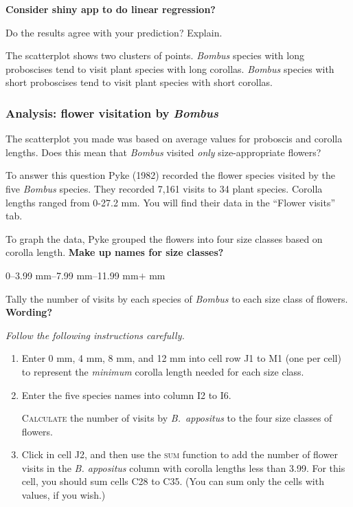 \documentclass[12pt, hidelinks]{exam}
\newcommand*\AnswerBox[2]{%
    \parbox[t][#1]{0.92\textwidth}{%
    \begin{solution}#2\end{solution}}
    \vspace{\stretch{1}}
}
\begin{document}
\begin{questions}
\textbf{Consider shiny app to do linear regression?}

\question
Do the results agree with your prediction? Explain.

\AnswerBox{3\baselineskip}{The scatterplot shows two clusters of points. 
\textit{Bombus} species with long proboscises tend to visit plant species with 
long corollas. \textit{Bombus} species with short proboscises tend to visit plant species with short corollas.}


\subsubsection*{Analysis: flower visitation by \textit{Bombus}}

The scatterplot you made was based on average values for proboscis and corolla 
lengths. Does this mean that \textit{Bombus} visited \emph{only} size-appropriate flowers?  

To answer this question Pyke (1982) recorded the flower species visited by the five \textit{Bombus} species. They recorded 7,161 visits to 34 plant species. Corolla lengths ranged from 0-27.2 mm. You will find their data in the “Flower visits” tab.

To graph the data, Pyke grouped the flowers into four size classes based on corolla length. \textbf{Make up names for size classes?}

0–3.99 mm–7.99 mm–11.99 mm$+$ mm

\question
Tally the number of visits by each species of \textit{Bombus} to each size class of flowers. \textbf{Wording?}

\emph{Follow the following instructions carefully.}

\begin{enumerate}
	\item Enter 0 mm, 4 mm, 8 mm, and 12 mm into cell row J1 to M1 (one per cell)
	to represent the \emph{minimum} corolla length needed for each size class.
	
	\item Enter the five species names into column I2 to I6.
	
	\textsc{Calculate} the number of visits by \textit{B.~appositus} to the four
	size classes of flowers. 
	
	\item Click in cell J2, and then use the \textsc{sum} function to add the
	number of flower visits in the \textit{B. appositus} column with corolla
	lengths less than 3.99. For this cell, you should sum cells C28 to C35. 
	(You can sum only the cells with values, if you wish.)
	

\end{enumerate}
\end{questions}
\end{document}
